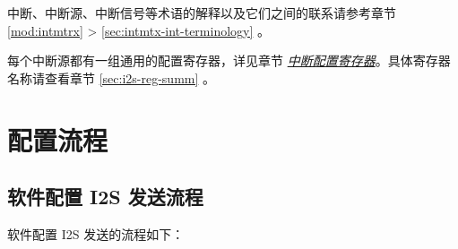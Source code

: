 \documentclass[main\_\_CN.tex]{subfiles}
\begin{document}
\begin{tiplisting}
中断、中断源、中断信号等术语的解释以及它们之间的联系请参考章节 \ref{mod:intmtrx} \textit{} > \ref{sec:intmtx-int-terminology} \textit{}。
\end{tiplisting}

每个中断源都有一组通用的配置寄存器，详见章节 \hyperref[interrupt-config-registers]{\textit{中断配置寄存器}}。具体寄存器名称请查看章节 \ref{sec:i2s-reg-summ} \textit{}。

\section{配置流程}
\label{sec:i2s-prog-procedures}
\subsection{软件配置 I2S 发送流程}\label{sec:i2s-configure-i2s-tx-mode}

软件配置 I2S 发送的流程如下：
\end{document}
